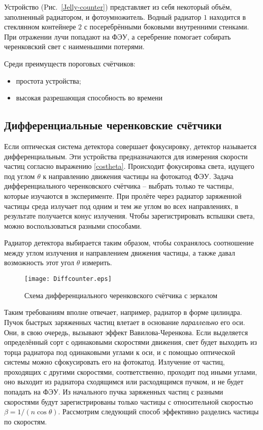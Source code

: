 \begin{main}
	Устройство (Pис.~\ref{Jelly-counter}) представляет из себя некоторый объём, заполненный радиатором, и фотоумножитель. Водный радиатор $ 1 $ находится в стеклянном контейнере $ 2 $ с посеребрёнными боковыми внутренними стенками. При отражении лучи попадают на ФЭУ, а серебрение помогает собирать черенковский свет с наименьшими потерями.
	
	Среди преимуществ пороговых счётчиков:
	\begin{itemize}
		\item простота устройства;
		\item высокая разрешающая способность во времени
	\end{itemize}
	
	\subsection{Дифференциальные черенковские счётчики}
	\label{sec:subsection}
	
	Если оптическая система детектора совершает фокусировку, детектор называется дифференциальным. Эти устройства предназначаются для измерения скорости частиц согласно выражению {\eqref{costheta}}.
	Происходит фокусировка света, идущего под углом $ \theta $ к направлению движения частицы на фотокатод ФЭУ. Задача дифференциального черенковского счётчика -- выбрать только те частицы, которые изучаются в эксперименте. 
	При пролёте через радиатор заряженной частицы среда излучает под одним и тем же углом во всех направлениях, в результате получается конус излучения.
	Чтобы зарегистрировать вспышки света, можно воспользоваться разными способами.
	
	 Радиатор детектора выбирается таким образом, чтобы сохранялось соотношение между углом излучения и направлением движения частицы, а также давал возможность этот угол $ \theta $ измерить.
	 \begin{figure}
	 	\noindent
	 	\hfil
	 	\texttt{[image: Diffcounter.eps]}
	 	\hfil
	 	\caption{Схема дифференциального черенковского счётчика с зеркалом}
	 	\label{diffscheme}
	 \end{figure}
	Таким требованиям вполне отвечает, например, радиатор в форме цилиндра. Пучок быстрых заряженных частиц влетает в основание \textit{параллельно} его оси.
	Они, в свою очередь, вызывают эффект Вавилова-Черенкова. Если выделяется определённый сорт с одинаковыми скоростями движения, свет будет выходить из торца радиатора под одинаковыми углами к оси, и с помощью оптической системы можно сфокусировать его на фотокатод. 
	Излучение от частиц, проходящих с другими скоростями, соответственно, проходит под иными углами, оно выходит из радиатора сходящимся или расходящимся пучком, и не будет попадать на ФЭУ.
	Из начального пучка заряженных частиц с разными скоростями будут зарегистрированы только частицы с относительной скоростью $\beta = 1/(n \cos{\theta}) $. Рассмотрим следующий способ эффективно разделись частицы по скоростям.
	

\end{main}
